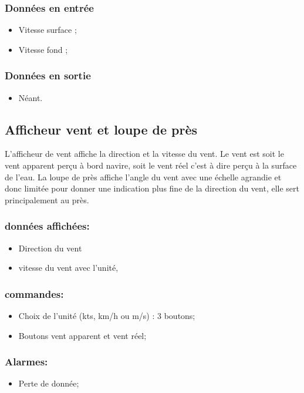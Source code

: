 \documentclass[a4paper,11pt]{report}
\begin{document}
\subsubsection{Données en entrée}
\begin{itemize}
	\item Vitesse surface ;
	\item Vitesse fond ;
\end{itemize}

\subsubsection{Données en sortie}
\begin{itemize}
	\item Néant.
\end{itemize}

\subsection{Afficheur vent et loupe de près}
L'afficheur de vent affiche la direction et la vitesse du vent.
Le vent est soit le vent apparent perçu à bord navire,
soit le vent réel c'est à dire perçu à la surface de l'eau.
La loupe de près affiche l'angle du vent avec une échelle agrandie
et donc limitée pour
donner une indication plus fine de la direction du vent,
elle sert principalement au près.



\subsubsection{données affichées:}
\begin{itemize}
	\item Direction du vent
	\item vitesse du vent avec l'unité, 
\end{itemize}

\subsubsection{commandes:}
\begin{itemize}
	\item Choix de l'unité (kts, km/h ou m/s) : 3 boutons;
	\item Boutons vent apparent et vent réel;
\end{itemize}

\subsubsection{Alarmes:}
\begin{itemize}
	\item Perte de donnée;
\end{itemize}
\end{document}
